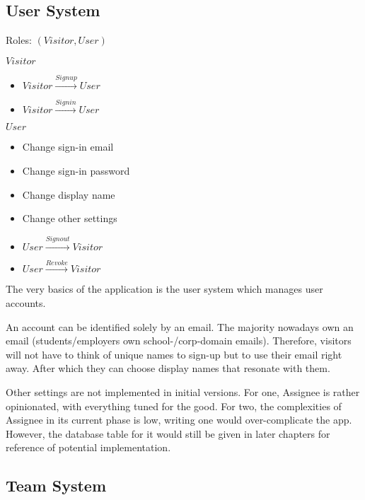 \subsection{User System}
\label{overview.capab.user}

Roles: $(Visitor, User)$

$Visitor$
\begin{itemize}
	\item $Visitor\xrightarrow{Signup}User$

	\item $Visitor\xrightarrow{Signin}User$
\end{itemize}

$User$
\begin{itemize}
	\item Change sign-in email

	\item Change sign-in password

	\item Change display name

	\item Change other settings \textdagger{}

	\item $User\xrightarrow{Signout}Visitor$

	\item $User\xrightarrow{Revoke}Visitor$
\end{itemize}

The very basics of the application is the user system which manages user
accounts.

An account can be identified solely by an email. The majority nowadays own an email
(students/employers own school-/corp-domain emails). Therefore, visitors will
not have to think of unique names to sign-up but to use their email right away. After
which they can choose display names that resonate with them.

\textdagger{} Other settings are not implemented in initial versions. For one,
Assignee is rather opinionated, with everything tuned for the good. For two, the
complexities of Assignee in its current phase is low, writing one would over-complicate
the app. However, the database table for it would still be given in later
chapters for reference of potential implementation.

\subsection{Team System}
\label{overview.capab.team}

